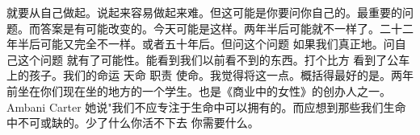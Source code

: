 就要从自己做起。说起来容易做起来难。但这可能是你要问你自己的。最重要的问题。而答案是有可能改变的。今天可能是这样。两年半后可能就不一样了。二十二年半后可能又完全不一样。或者五十年后。但问这个问题 如果我们真正地。问自己这个问题 就有了可能性。能看到我们以前看不到的东西。打个比方 看到了公车上的孩子。我们的命运 天命 职责 使命。我觉得将这一点。概括得最好的是。两年前坐在你们现在坐的地方的一个学生。也是《商业中的女性》的创办人之一。Ambani Carter 她说"我们不应专注于生命中可以拥有的。而应想到那些我们生命中不可或缺的。少了什么你活不下去 你需要什么。 
%
%
%
